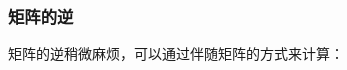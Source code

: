 \documentclass[12pt]{article}
\begin{document}
\begin{Shaded}
\begin{Highlighting}[]
\OperatorTok{=}\OperatorTok{(}\OperatorTok{[}\OperatorTok{][}\OperatorTok{].}\OperatorTok{(}\OperatorTok{(}\OperatorTok{(}\OperatorTok{,}\OperatorTok{())));}
        \OperatorTok{\}}
        \OperatorTok{;}
    \OperatorTok{\}}
\OperatorTok{\}}
\end{Highlighting}
\end{Shaded}

\subsubsection{矩阵的逆}\label{ux77e9ux9635ux7684ux9006}

矩阵的逆稍微麻烦，可以通过伴随矩阵的方式来计算：
\end{document}
